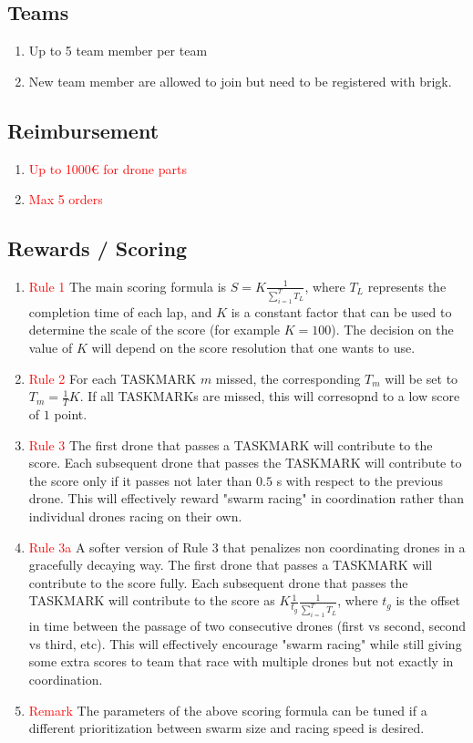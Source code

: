 \subsection{Teams}
\begin{enumerate}
	\item{Up to 5 team member per team}
	\item{New team member are allowed to join but need to be registered with brigk.}
\end{enumerate}

\subsection{Reimbursement}
\begin{enumerate}
	\item{\textcolor{red}{Up to 1000€ for drone parts}}
	\item{\textcolor{red}{Max 5 orders}}
\end{enumerate}

\subsection{Rewards / Scoring}
\begin{enumerate}
	\item{\textcolor{red}{Rule 1} The main scoring formula is $S = K \frac{1}{\sum_{i=1}^{T} T_L }$, where $T_L$ represents the completion time of each lap, and $K$ is a constant factor that can be used to determine the scale of the score (for example $K=100$). The decision on the value of $K$ will depend on the score resolution that one wants to use.}
	\item{\textcolor{red}{Rule 2} For each TASKMARK $m$ missed, the corresponding $T_m$ will be set to $T_m = \frac{1}{T} K$. If all TASKMARKs are missed, this will corresopnd to a low score of $1$ point.}
	\item{\textcolor{red}{Rule 3}} The first drone that passes a TASKMARK will contribute to the score. Each subsequent drone that passes the TASKMARK will contribute to the score only if it passes not later than $0.5$ s with respect to the previous drone. This will effectively reward "swarm racing" in coordination rather than individual drones racing on their own.
        \item{\textcolor{red}{Rule 3a}} A softer version of Rule 3 that penalizes non coordinating drones in a gracefully decaying way. The first drone that passes a TASKMARK will contribute to the score fully. Each subsequent drone that passes the TASKMARK will contribute to the score as $K \frac{1}{t_g} \frac{1}{\sum_{i=1}^{T} T_L }$, where $t_g$ is the offset in time between the passage of two consecutive drones (first vs second, second vs third, etc).  This will effectively encourage "swarm racing" while still giving some extra scores to team that race with multiple drones but not exactly in coordination.
	\item{\textcolor{red}{Remark}} The parameters of the above scoring formula can be tuned if a different prioritization between swarm size and racing speed is desired.
\end{enumerate}

